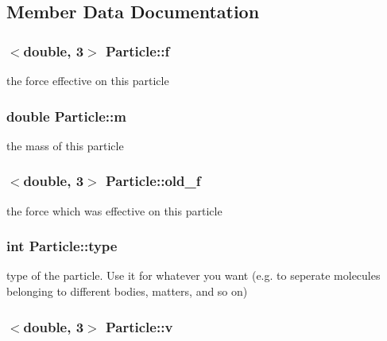 \subsection{Member Data Documentation}
\hypertarget{classParticle_ad9aa3e171ea950b2cff1b4825e67845b}{
\subsubsection[{f}]{$<$double, 3$>$ Particle\-::f\hspace{0.3cm}{\ttfamily [private]}}}\label{classParticle_ad9aa3e171ea950b2cff1b4825e67845b}
the force effective on this particle \hypertarget{classParticle_aedcc7e1bc53b0e2b1a4a07c9a1b47563}{
\subsubsection[{m}]{\setlength{\rightskip}{0pt plus 5cm}double Particle\-::m\hspace{0.3cm}{\ttfamily [private]}}}\label{classParticle_aedcc7e1bc53b0e2b1a4a07c9a1b47563}
the mass of this particle \hypertarget{classParticle_ad9281e33474f23f7261f28848affc4a4}{
\subsubsection[{old\-\_\-f}]{$<$double, 3$>$ Particle\-::old\-\_\-f\hspace{0.3cm}{\ttfamily [private]}}}\label{classParticle_ad9281e33474f23f7261f28848affc4a4}
the force which was effective on this particle \hypertarget{classParticle_a2b73dd42bcd56ba2e7ffeb0a5515a866}{
\subsubsection[{type}]{\setlength{\rightskip}{0pt plus 5cm}int Particle\-::type\hspace{0.3cm}{\ttfamily [private]}}}\label{classParticle_a2b73dd42bcd56ba2e7ffeb0a5515a866}
type of the particle. Use it for whatever you want (e.\-g. to seperate molecules belonging to different bodies, matters, and so on) \hypertarget{classParticle_ac3669e50d83d8608d522965b9acd1d8b}{
\subsubsection[{v}]{$<$double, 3$>$ Particle\-::v\hspace{0.3cm}{\ttfamily [private]}}}\label{classParticle_ac3669e50d83d8608d522965b9acd1d8b}
